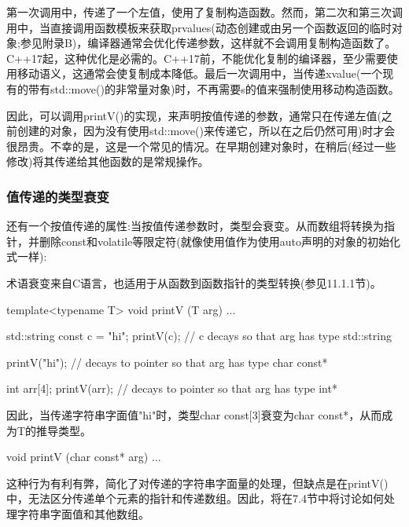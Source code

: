 第一次调用中，传递了一个左值，使用了复制构造函数。然而，第二次和第三次调用中，当直接调用函数模板来获取prvalues(动态创建或由另一个函数返回的临时对象;参见附录B)，编译器通常会优化传递参数，这样就不会调用复制构造函数了。C++17起，这种优化是必需的。C++17前，不能优化复制的编译器，至少需要使用移动语义，这通常会使复制成本降低。最后一次调用中，当传递xvalue(一个现有的带有std::move()的非常量对象)时，不再需要s的值来强制使用移动构造函数。

因此，可以调用printV()的实现，来声明按值传递的参数，通常只在传递左值(之前创建的对象，因为没有使用std::move()来传递它，所以在之后仍然可用)时才会很昂贵。不幸的是，这是一个常见的情况。在早期创建对象时，在稍后(经过一些修改)将其传递给其他函数的是常规操作。

\subsubsection{值传递的类型衰变}

还有一个按值传递的属性:当按值传递参数时，类型会衰变。从而数组将转换为指针，并删除const和volatile等限定符(就像使用值作为使用auto声明的对象的初始化式一样):

\begin{notice}
术语衰变来自C语言，也适用于从函数到函数指针的类型转换(参见11.1.1节)。
\end{notice}

\begin{cpp}
template<typename T>
void printV (T arg) {
	...
}

std::string const c = "hi";
printV(c); // c decays so that arg has type std::string

printV("hi"); // decays to pointer so that arg has type char const*

int arr[4];
printV(arr); // decays to pointer so that arg has type int*
\end{cpp}

因此，当传递字符串字面值"hi"时，类型char const[3]衰变为char const*，从而成为T的推导类型。

\begin{cpp}
void printV (char const* arg)
{
	...
}
\end{cpp}

这种行为有利有弊，简化了对传递的字符串字面量的处理，但缺点是在printV()中，无法区分传递单个元素的指针和传递数组。因此，将在7.4节中将讨论如何处理字符串字面值和其他数组。




